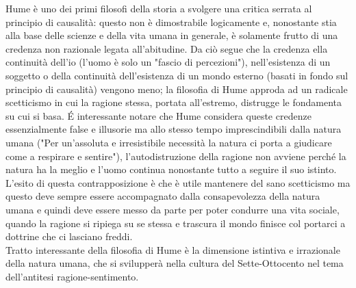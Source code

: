 \documentclass[10pt,a4paper]{article}
\begin{document}
Hume è uno dei primi filosofi della storia a svolgere una critica serrata al principio di causalità: questo non è dimostrabile logicamente e, nonostante stia alla base delle scienze e della vita umana in generale, è solamente frutto di una credenza non razionale legata all'abitudine. Da ciò segue che la credenza ella continuità dell'io (l'uomo è solo un "fascio di percezioni"), nell'esistenza di un soggetto o della continuità dell'esistenza di un mondo esterno (basati in fondo sul principio di causalità) vengono meno; la filosofia di Hume approda ad un radicale scetticismo in cui la ragione stessa, portata all'estremo, distrugge le fondamenta su cui si basa. \'E interessante notare che Hume considera queste credenze essenzialmente false e illusorie ma allo stesso tempo imprescindibili dalla natura umana ("Per un'assoluta e irresistibile necessità la natura ci porta a giudicare come a respirare e sentire"), l'autodistruzione della ragione non avviene perché la natura ha la meglio e l'uomo continua nonostante tutto a seguire il suo istinto. L'esito di questa contrapposizione è che è utile mantenere del sano scetticismo ma questo deve sempre essere accompagnato dalla consapevolezza della natura umana e quindi deve essere messo da parte per poter condurre una vita sociale, quando la ragione si ripiega su se stessa e trascura il mondo finisce col portarci a dottrine che ci lasciano freddi.\\
Tratto interessante della filosofia di Hume è la dimensione istintiva e irrazionale della natura umana, che si svilupperà nella cultura del Sette-Ottocento nel tema dell'antitesi ragione-sentimento.
\end{document}
